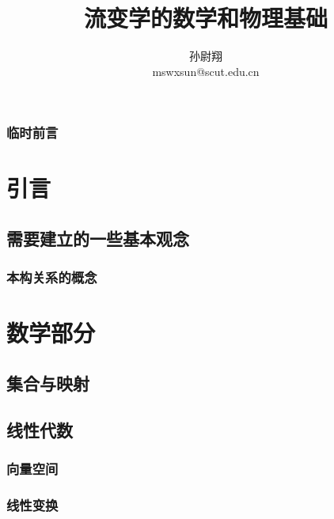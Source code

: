 \documentclass[zihao=-4,linespread=1.5,a4paper,heading=true,twoside]{ctexbook}
\title{流变学的数学和物理基础}
\author{孙尉翔\\mswxsun@scut.edu.cn}
\theoremstyle{definition}
\theoremstyle{plain}
\begin{document}
\maketitle

\frontmatter
{}
\section*{临时前言}\label{sec:preface}


\tableofcontents
\mainmatter
{}

\part{引言}
\chapter{需要建立的一些基本观念}\label{sec:I}
\section{本构关系的概念}\label{sec:I.1}
\label{sec:I.1.1}

\part{数学部分}\label{sec:II}
\chapter{集合与映射}\label{sec:II.1}
\label{sec:II.1.1}
\label{sec:II.1.2}
\label{sec:II.1.3}

\chapter{线性代数}\label{sec:II.2}
\section{向量空间}\label{sec:II.2.1}


\section{线性变换}\label{sec:II.2.2}
\end{document}
